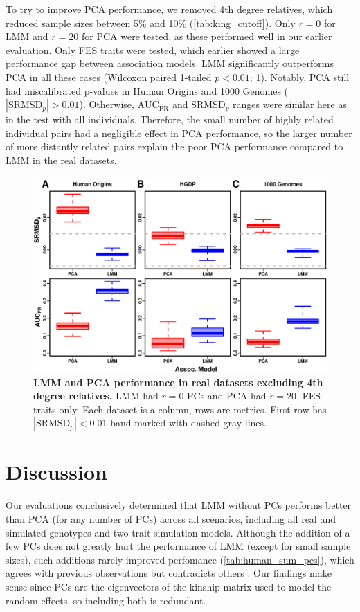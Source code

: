 \documentclass[11pt]{article}
\newcommand{\rmsd}{\text{SRMSD}_p}
\newcommand{\auc}{\text{AUC}_\text{PR}}
\begin{document}
To try to improve PCA performance, we removed 4th degree relatives, which reduced sample sizes between 5\% and 10\% (\cref{tab:king_cutoff}).
Only $r=0$ for LMM and $r=20$ for PCA were tested, as these performed well in our earlier evaluation.
Only FES traits were tested, which earlier showed a large performance gap between association models.
LMM significantly outperforms PCA in all these cases (Wilcoxon paired 1-tailed $p < 0.01$; \cref{fig:king_cutoff}).
Notably, PCA still had miscalibrated p-values in Human Origins and 1000 Genomes ($|\rmsd| > 0.01$).
Otherwise, $\auc$ and $\rmsd$ ranges were similar here as in the test with all individuals.
Therefore, the small number of highly related individual pairs had a negligible effect in PCA performance, so the larger number of more distantly related pairs explain the poor PCA performance compared to LMM in the real datasets.

\begin{figure}[bp!]
  \centering
  \includegraphics[width=\textwidth]{fes/rmsd-auc_king-cutoff-4.pdf}
  \caption{
    {\bf LMM and PCA performance in real datasets excluding 4th degree relatives.}
    LMM had $r=0$ PCs and PCA had $r=20$.
    FES traits only.
    Each dataset is a column, rows are metrics.
    First row has $|\rmsd| < 0.01$ band marked with dashed gray lines.
  }
  \label{fig:king_cutoff}
\end{figure}


\section{Discussion}

Our evaluations conclusively determined that LMM without PCs performs better than PCA (for any number of PCs) across all scenarios, including all real and simulated genotypes and two trait simulation models.
Although the addition of a few PCs does not greatly hurt the performance of LMM (except for small sample sizes), such additions rarely improved perfomance (\cref{tab:human_sum_pcs}), which agrees with previous observations \citep{liu_controlling_2011} but contradicts others \citep{zhao_arabidopsis_2007, price_new_2010}.
Our findings make sense since PCs are the eigenvectors of the kinship matrix used to model the random effects, so including both is redundant.
\end{document}
